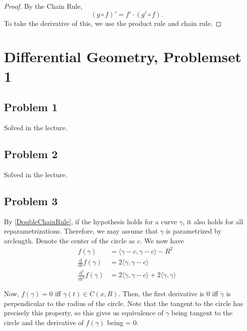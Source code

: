 \begin{proof}
    By the Chain Rule,
\[
    (g\circ f)' = f' \cdot (g' \circ f).
\]
    To take the derivative of this, we use the product rule and chain rule.
\end{proof}

\chapter{Differential Geometry, Problemset 1}

\section{Problem 1}
Solved in the lecture.

\section{Problem 2}
Solved in the lecture.

\section{Problem 3}

By \ref{DoubleChainRule}, if the hypothesis holds for a curve \(\gamma\), it also holds for all reparametrizations. Therefore, we may assume that \(\gamma\) is parametrized by arclength. Denote the center of the circle as \(c\). We now have
\begin{align*}
    f(\gamma) &= \langle \gamma - c, \gamma - c \rangle - R^2 \\
    \frac{\mathrm{d}}{\mathrm{d}t} f(\gamma) &= 2\langle \dot\gamma, \gamma - c \rangle \\
    \frac{\mathrm{d^2}}{\mathrm{d}t^2} f(\gamma) &= 2\langle \ddot\gamma, \gamma - c \rangle + 2\langle \dot\gamma, \dot\gamma \rangle
\end{align*}

Now, \(f(\gamma) = 0\) iff \(\gamma(t) \in C(x, R)\). Then, the first derivative is 0 iff \(\dot\gamma\) is perpendicular to the radius of the circle. Note that the tangent to the circle has precisely this property, so this gives us equivalence of \(\gamma\) being tangent to the circle and the derivative of \(f(\gamma)\) being = 0.

